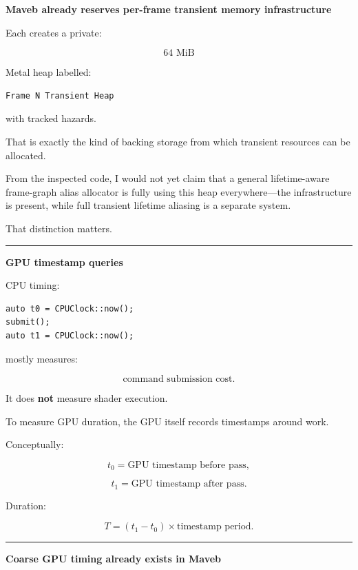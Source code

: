 \textbf{Maveb already reserves per-frame transient memory infrastructure}

Each  creates a private:

\[
64\text{ MiB}
\]

Metal heap labelled:

\protect{}\label{p10-transient}%
\begin{verbatim}
Frame N Transient Heap
\end{verbatim}

with tracked hazards.

That is exactly the kind of backing storage from which transient resources can be allocated.

From the inspected code, I would not yet claim that a general lifetime-aware frame-graph alias allocator is fully using this heap everywhere---the infrastructure is present, while full transient lifetime aliasing is a separate system.

That distinction matters.

\begin{center}\rule{0.5\linewidth}{0.5pt}\end{center}

\textbf{GPU timestamp queries}

CPU timing:

\protect{}\label{p10-wrong-gpu-time}%
\begin{verbatim}
auto t0 = CPUClock::now();
submit();
auto t1 = CPUClock::now();
\end{verbatim}

mostly measures:

\[
\text{command submission cost}.
\]

It does \textbf{not} measure shader execution.

To measure GPU duration, the GPU itself records timestamps around work.

Conceptually:

\[
t_0=\text{GPU timestamp before pass},
\]

\[
t_1=\text{GPU timestamp after pass}.
\]

Duration:

\[
\boxed{
T=
(t_1-t_0)\times
\text{timestamp period}.
}
\]

\begin{center}\rule{0.5\linewidth}{0.5pt}\end{center}

\textbf{Coarse GPU timing already exists in Maveb}

